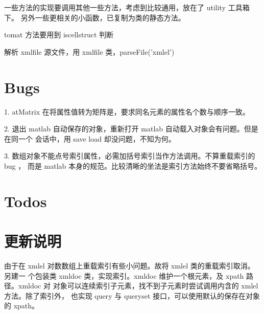 一些方法的实现要调用其他一些方法，考虑到比较通用，放在了 utility 工具箱下。
另外一些更相关的小函数，已复制为类的静态方法。

tomat 方法要用到 iscellstruct 判断

解析 xmlfile 源文件，用 xmlfile 类，parseFile('xmlel')

\section{Bugs}

1. atMatrix 在将属性值转为矩阵是，要求同名元素的属性名个数与顺序一致。

2. 退出 matlab 自动保存的对象，重新打开 matlab 自动载入对象会有问题。但是在同一个
会话中，用 save load 却没问题，不知为何。

3. 数组对象不能点号索引属性，必需加括号索引当作方法调用。不算重载索引的 bug ，
而是 matlab 本身的规范。比较清晰的坐法是索引方法始终不要省略括号。

\section{Todos}

\section{更新说明}

由于在 xmlel 对数数组上重载索引有些小问题。故将 xmlel 类的重载索引取消。另建一
个包装类 xmldoc 类，实现索引。xmldoc 维护一个根元素，及 xpath 路径。xmldoc 对
对象可以连续索引子元素，找不到子元素时尝试调用内含的 xmlel 方法。除了索引外，
也实现 query 与 queryset 接口，可以使用默认的保存在对象的 xpath。


